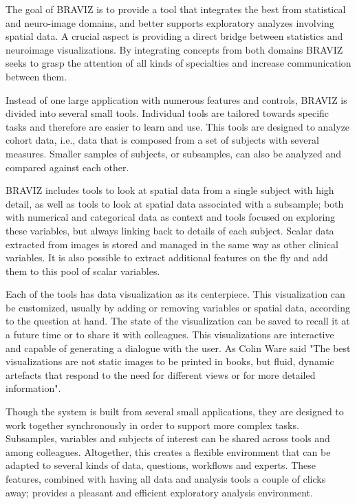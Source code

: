 \documentclass[utf8,paper]{frontiersSCNS} %
\begin{document}
The goal of BRAVIZ is to provide a tool that integrates the best from  statistical and neuro-image domains, and better supports exploratory analyzes involving spatial data. A crucial aspect is providing a direct bridge between statistics and neuroimage visualizations. By integrating concepts from both domains BRAVIZ seeks to grasp the attention of all kinds of specialties and increase communication between them.  

Instead of one large application with numerous features and controls, BRAVIZ is divided into several small tools. Individual tools are tailored towards specific tasks and therefore are easier to learn and use. This tools are designed to analyze cohort data, i.e., data that is composed from a set of subjects with several measures. Smaller samples of subjects, or subsamples, can also be analyzed and compared against each other. 

BRAVIZ includes tools to look at spatial data from a single subject with high detail, as well as tools to look at spatial data associated with a subsample; both with numerical and categorical data as context and tools focused on exploring these variables, but always linking back to details of each subject. Scalar data extracted from images is stored and managed in the same way as other clinical variables. It is also possible to extract additional features on the fly and add them to this pool of scalar variables.

Each of the tools has data visualization as its centerpiece. This visualization can be customized, usually by adding or removing variables or spatial data, according to the question at hand. The state of the visualization can be saved  to recall it at a future time or to share it with colleagues. 
This visualizations are interactive and capable of generating a dialogue with the user.
As Colin Ware \citep{ware_information_2004} said "The best visualizations are not static images to be printed in books, but fluid, dynamic artefacts that respond to the need for different views or for more detailed information".  

Though the system is built from several small applications, they are designed to work together synchronously in order to support more complex tasks. Subsamples, variables and subjects of interest can be shared across tools and among colleagues. Altogether, this creates a flexible environment that can be adapted to several kinds of data, questions, workflows and experts. These features, combined with having all data and analysis tools a couple of clicks away; provides a pleasant and efficient exploratory analysis environment. 
\end{document}
